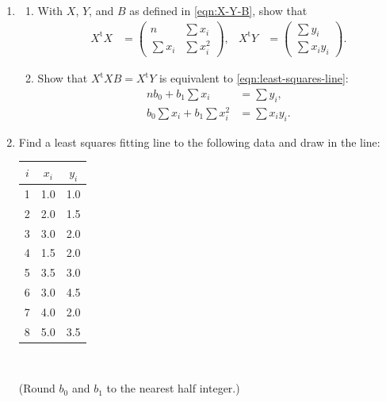\documentclass[a4paper, 12pt]{article}
\numberwithin{equation}{section}
\numberwithin{figure}{section}
\theoremstyle{definition}
\newcommand{\tr}{\mathrm{t}}
\begin{document}
\begin{enumerate}
	\item 
	\begin{enumerate} 
		\item With $X$, $Y$, and $B$ as defined in \eqref{eqn:X-Y-B}, show that 
		\begin{align*}
			X^\tr X &= \begin{pmatrix}
				n & \sum x_i \\ \sum x_i & \sum x_i^2
			\end{pmatrix}, & 
			X^\tr Y &= \begin{pmatrix}
				\sum y_i \\ \sum x_iy_i
			\end{pmatrix}. 
		\end{align*}
		\item Show that $X^\tr XB = X^\tr Y$ is equivalent to
		\eqref{eqn:least-squares-line}:
		\begin{align*}
			nb_0 + b_1\sum x_i &= \sum y_i, \\
			b_0 \sum x_i + b_1 \sum x_i^2 &= \sum x_iy_i.
		\end{align*}
	\end{enumerate}
	\item Find a least squares fitting line to the following data and draw in
	the line:
	
	\begin{minipage}{0.3\textwidth}
		\centering 
		\begin{tabular}{ccc}
			$i$ & $x_i$ & $y_i$ \\ \hline
			1 & 1.0 & 1.0 \\ 
			2 & 2.0 & 1.5 \\
			3 & 3.0 & 2.0 \\
			4 & 1.5 & 2.0 \\ 
			5 & 3.5 & 3.0 \\ 
			6 & 3.0 & 4.5 \\ 
			7 & 4.0 & 2.0 \\ 
			8 & 5.0 & 3.5
		\end{tabular}
	\end{minipage}~%
	\begin{minipage}{0.6\textwidth}
	\end{minipage}

	(Round $b_0$ and $b_1$ to the nearest half integer.)
\end{enumerate}
\end{document}

